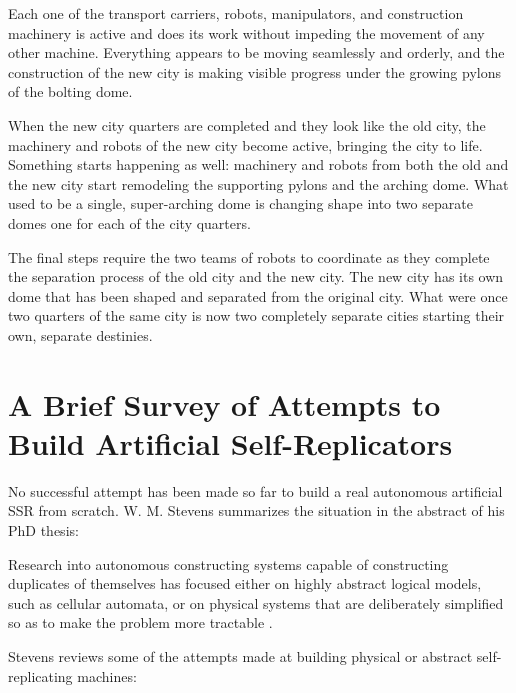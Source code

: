 Each one of the transport carriers, robots, manipulators, and
construction machinery is active and does its work without impeding the
movement of any other machine. Everything appears to be moving
seamlessly and orderly, and the construction of the new city is making
visible progress under the growing pylons of the bolting dome.

When the new city quarters are completed and they look
like the old city, the machinery and
robots of the new city become active, bringing the city to life. Something starts happening
as well: machinery and robots from both the old and the new city start
remodeling the supporting pylons and the arching dome.  
What used to be a single, super-arching dome is changing shape into two
separate domes one for each of the city quarters.

The final steps require the two teams of robots to coordinate as they complete the separation process of the old city and the new city. The new city has its own dome that has been shaped and separated from the original city. What were once two quarters of the same city is now two completely separate cities starting their own, separate destinies.

\section{A Brief Survey of Attempts to Build Artificial Self-Replicators}

No successful attempt has been made so far to build a real
autonomous artificial SSR from scratch. W. M. Stevens summarizes the
situation in the abstract of his PhD thesis:

\begin{quoting}
Research into autonomous constructing systems capable of constructing
duplicates of themselves has focused either on highly abstract logical models, such as
cellular automata, or on physical systems that are deliberately simplified so as to make
the problem more tractable \citep{stevens2009}.
\end{quoting}

Stevens reviews some of the attempts made at building physical or
abstract self-replicating machines:

